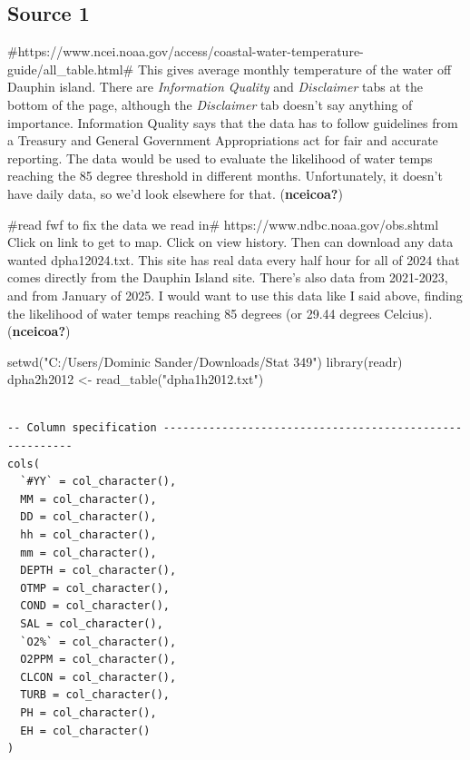\documentclass[
  letterpaper,
  DIV=11,
  numbers=noendperiod]{scrreprt}
\newenvironment{Shaded}{\begin{snugshade}}{\end{snugshade}}
\newcommand{\FunctionTok}[1]{\textcolor[rgb]{0.28,0.35,0.67}{#1}}
\newcommand{\NormalTok}[1]{\textcolor[rgb]{0.00,0.23,0.31}{#1}}
\newcommand{\OtherTok}[1]{\textcolor[rgb]{0.00,0.23,0.31}{#1}}
\newcommand{\StringTok}[1]{\textcolor[rgb]{0.13,0.47,0.30}{#1}}
\begin{document}
\subsection{Source 1}\label{source-1}

\#https://www.ncei.noaa.gov/access/coastal-water-temperature-guide/all\_table.html\#
This gives average monthly temperature of the water off Dauphin island.
There are \emph{Information Quality} and \emph{Disclaimer} tabs at the
bottom of the page, although the \emph{Disclaimer} tab doesn't say
anything of importance. Information Quality says that the data has to
follow guidelines from a Treasury and General Government Appropriations
act for fair and accurate reporting. The data would be used to evaluate
the likelihood of water temps reaching the 85 degree threshold in
different months. Unfortunately, it doesn't have daily data, so we'd
look elsewhere for that. (\textbf{nceicoa?})

\#read fwf to fix the data we read in\#
https://www.ndbc.noaa.gov/obs.shtml Click on link to get to map. Click
on view history. Then can download any data wanted dpha12024.txt. This
site has real data every half hour for all of 2024 that comes directly
from the Dauphin Island site. There's also data from 2021-2023, and from
January of 2025. I would want to use this data like I said above,
finding the likelihood of water temps reaching 85 degrees (or 29.44
degrees Celcius). (\textbf{nceicoa?})

\begin{Shaded}
\begin{Highlighting}[]
\FunctionTok{setwd}\NormalTok{(}\StringTok{"C:/Users/Dominic Sander/Downloads/Stat 349"}\NormalTok{)}
\FunctionTok{library}\NormalTok{(readr)}
\NormalTok{dpha2h2012 }\OtherTok{\textless{}{-}} \FunctionTok{read\_table}\NormalTok{(}\StringTok{"dpha1h2012.txt"}\NormalTok{)}
\end{Highlighting}
\end{Shaded}

\begin{verbatim}

-- Column specification --------------------------------------------------------
cols(
  `#YY` = col_character(),
  MM = col_character(),
  DD = col_character(),
  hh = col_character(),
  mm = col_character(),
  DEPTH = col_character(),
  OTMP = col_character(),
  COND = col_character(),
  SAL = col_character(),
  `O2%` = col_character(),
  O2PPM = col_character(),
  CLCON = col_character(),
  TURB = col_character(),
  PH = col_character(),
  EH = col_character()
)
\end{verbatim}
\end{document}
